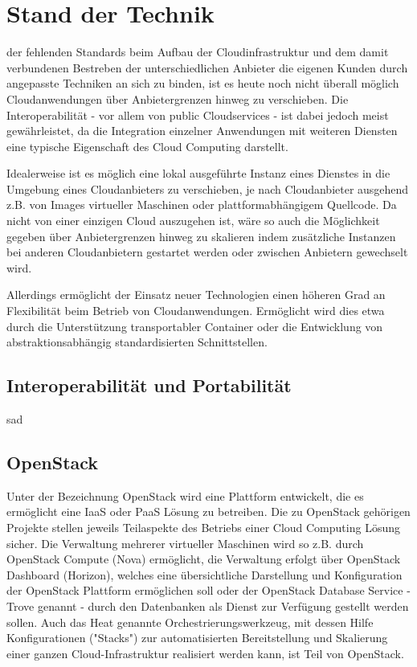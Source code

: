 \section{Stand der Technik}
\label{sec_facts}

 der fehlenden Standards beim Aufbau der Cloudinfrastruktur und dem damit verbundenen Bestreben der unterschiedlichen Anbieter die eigenen Kunden durch angepasste Techniken an sich zu binden, ist es heute noch nicht überall möglich Cloudanwendungen über Anbietergrenzen hinweg zu verschieben. Die Interoperabilität - vor allem von public Cloudservices - ist dabei jedoch meist gewährleistet, da die Integration einzelner Anwendungen mit weiteren Diensten eine typische Eigenschaft des Cloud Computing darstellt.

Idealerweise ist es möglich eine lokal ausgeführte Instanz eines Dienstes in die Umgebung eines Cloudanbieters zu verschieben, je nach Cloudanbieter ausgehend z.B. von Images virtueller Maschinen oder plattformabhängigem Quellcode. Da nicht von einer einzigen Cloud auszugehen ist, wäre so auch die Möglichkeit gegeben über Anbietergrenzen hinweg zu skalieren indem zusätzliche Instanzen bei anderen Cloudanbietern gestartet werden oder zwischen Anbietern gewechselt wird.

Allerdings ermöglicht der Einsatz neuer Technologien einen höheren Grad an Flexibilität beim Betrieb von Cloudanwendungen. Ermöglicht wird dies etwa durch die Unterstützung transportabler Container oder die Entwicklung von abstraktionsabhängig standardisierten Schnittstellen.

\subsection{Interoperabilität und Portabilität}
sad

\subsection{OpenStack}
Unter der Bezeichnung OpenStack wird eine Plattform entwickelt, die es ermöglicht eine IaaS oder PaaS Lösung zu betreiben. Die zu OpenStack gehörigen Projekte stellen jeweils Teilaspekte des Betriebs einer Cloud Computing Lösung sicher. Die Verwaltung mehrerer virtueller Maschinen wird so z.B. durch OpenStack Compute (Nova) ermöglicht, die Verwaltung erfolgt über OpenStack Dashboard (Horizon), welches eine übersichtliche Darstellung und Konfiguration der OpenStack Plattform ermöglichen soll oder der OpenStack Database Service - Trove genannt - durch den Datenbanken als Dienst zur Verfügung gestellt werden sollen. Auch das Heat genannte Orchestrierungswerkzeug, mit dessen Hilfe Konfigurationen ("Stacks") zur automatisierten Bereitstellung und Skalierung einer ganzen Cloud-Infrastruktur realisiert werden kann, ist Teil von OpenStack.

